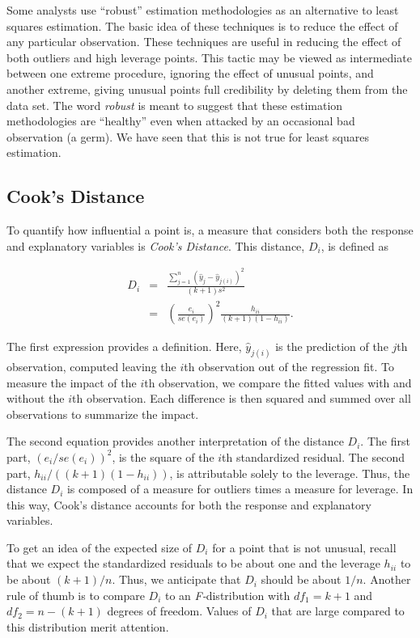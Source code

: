Some analysts use ``robust'' estimation methodologies as an
alternative to least squares estimation. The basic idea of these
techniques is to reduce the effect of any particular observation.
These techniques are useful in reducing the effect of both outliers
and high leverage points. This tactic may be viewed as intermediate
between one extreme procedure, ignoring the effect of unusual
points, and another extreme, giving unusual points full credibility
by deleting them from the data set. The word \textit{robust }is
meant to suggest that these estimation methodologies are ``healthy''
even when attacked by an occasional bad observation (a germ). We
have seen that this is not true for least squares estimation.

\subsection{Cook's Distance}

To quantify how influential a point is, a measure that considers
both the response and explanatory variables is \textit{Cook's
Distance}. This distance, $D_{i}$, is defined as

\begin{eqnarray}
D_{i} &=&\frac{\sum_{j=1}^{n}(\hat{y}_{j}-\hat{y}_{j(i)})^{2}}{(k+1)s^{2}}
\label{2} \\
&=&\left(\frac{e_i}{se(e_i)}\right)^{2}\frac{h_{ii}}{(k+1)(1-h_{ii})}.
\nonumber
\end{eqnarray}

\noindent The first expression provides a definition. Here,
$\hat{y}_{j(i)}$ is the prediction of the $j$th observation,
computed leaving the $i$th observation out of the regression fit. To
measure the impact of the $i$th observation, we compare the fitted
values with and without the $i$th observation. Each difference is
then squared and summed over all observations to summarize the
impact.

The second equation provides another interpretation of the distance
$D_{i}$. The first part, $(e_i/se(e_i))^{2}$, is the square of the
$i$th standardized residual. The second part,
$h_{ii}/((k+1)(1-h_{ii}))$, is attributable solely to the leverage.
Thus, the distance $D_{i}$ is composed of a measure for outliers
times a measure for leverage. In this way, Cook's distance accounts
for both the response and explanatory variables.

To get an idea of the expected size of $D_{i}$ for a point that is not
unusual, recall that we expect the standardized residuals to be about one
and the leverage $h_{ii}$ to be about $(k+1)/n$. Thus, we anticipate that $%
D_{i}$ should be about $1/n$. Another rule of thumb is to compare $D_{i}$ to
an \textit{F-}distribution with $df_{1}=k+1$ and $df_{2}=n-(k+1)$ degrees of
freedom. Values of $D_{i}$ that are large compared to this distribution
merit attention.

